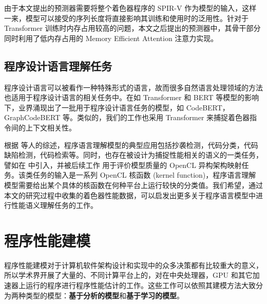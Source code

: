 由于本文提出的预测器需要将整个着色器程序的 SPIR-V 作为模型的输入，这样一来，模型可以接受的序列长度将直接影响其训练和使用时的泛用性。针对于 Transformer 训练时内存占用较高的问题，本文之后提出的预测器中，其骨干部分同时利用了低内存占用的 Memory Efficient Attention \cite{rabe2022selfattention} 注意力实现。

\subsection{程序设计语言理解任务}

程序设计语言可以被看作一种特殊形式的语言，故而很多自然语言处理领域的方法也适用于程序设计语言的相关任务中。在如 Transformer\cite{Vaswani2017AttentionIA} 和 BERT\cite{devlin-etal-2019-bert} 等模型的影响下，业界涌现出了一批用于程序设计语言任务的模型，如 CodeBERT\cite{feng-etal-2020-codebert}，GraphCodeBERT\cite{DBLP:conf/iclr/GuoRLFT0ZDSFTDC21} 等。类似的，我们的工作也采用 Transformer 来捕捉着色器指令间的上下文相关性。

根据 \citet{ijcai2022p775} 等人的综述，程序语言理解模型的典型应用包括抄袭检测，代码分类，代码缺陷检测，代码检索等。同时，也存在被设计为捕捉性能相关的语义的一类任务，譬如在 \citet{8091247} 中引入，并被后续工作 \cite{pmlr-v139-peng21b, pmlr-v139-cummins21a} 用于评价模型质量的 OpenCL 异构架构映射任务。该类任务的输入是一系列 OpenCL 核函数 (kernel function)，程序语言理解模型需要给出某个具体的核函数在何种平台上运行较快的分类值。我们希望，通过本文的研究过程中收集的着色器性能数据，可以启发出更多关于程序语言模型中进行性能语义理解任务的工作。

\section{程序性能建模}

程序性能建模对于计算机软件架构设计和实现中的众多决策都有比较重大的意义，所以学术界开展了大量的、不同计算平台上的，对在中央处理器，GPU 和其它加速器上运行的程序进行程序性能估计的工作。这些工作可以依照其建模方法大致分为两种类型的模型：\textbf{基于分析的模型}和\textbf{基于学习的模型}。


